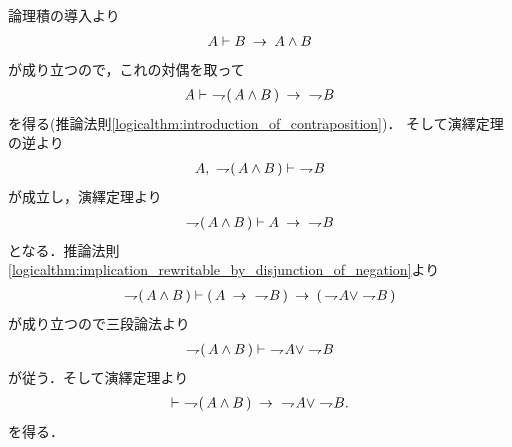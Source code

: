 	\begin{prf}
		論理積の導入より
		\begin{align}
			A \vdash B \rarrow A \wedge B
		\end{align}
		が成り立つので，これの対偶を取って
		\begin{align}
			A \vdash\ \negation (\, A \wedge B\, ) \rarrow\ \negation B
		\end{align}
		を得る(推論法則\ref{logicalthm:introduction_of_contraposition})．
		そして演繹定理の逆より
		\begin{align}
			A,\ \negation (\, A \wedge B\, ) \vdash\ \negation B
		\end{align}
		が成立し，演繹定理より
		\begin{align}
			\negation (\, A \wedge B\, ) \vdash A \rarrow\ \negation B
		\end{align}
		となる．推論法則\ref{logicalthm:implication_rewritable_by_disjunction_of_negation}より
		\begin{align}
			\negation (\, A \wedge B\, ) \vdash (\, A \rarrow\ \negation B\, )
			\rarrow (\, \negation A \vee \negation B\, )
		\end{align}
		が成り立つので三段論法より
		\begin{align}
			\negation (\, A \wedge B\, ) \vdash\ \negation A \vee \negation B
		\end{align}
		が従う．そして演繹定理より
		\begin{align}
			\vdash\ \negation (\, A \wedge B\, )
			\rarrow\ \negation A \vee \negation B.
		\end{align}
		を得る．
		\QED
	\end{prf}